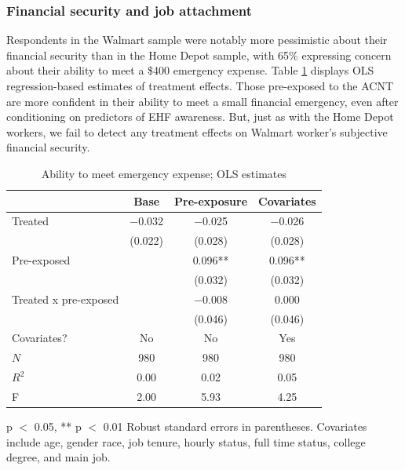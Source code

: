 \documentclass[
  11pt,
  oneside]{article}
\begin{document}
\subsubsection{Financial security and job attachment}\label{financial-security-and-job-attachment}

Respondents in the Walmart sample were notably more pessimistic about their financial security than in the Home Depot sample, with 65\% expressing concern about their ability to meet a \$400 emergency expense. Table \ref{tab:tab-finsec-wmt} displays OLS regression-based estimates of treatment effects. Those pre-exposed to the ACNT are more confident in their ability to meet a small financial emergency, even after conditioning on predictors of EHF awareness. But, just as with the Home Depot workers, we fail to detect any treatment effects on Walmart worker's subjective financial security.

\begin{table}
\centering
\caption{\label{tab:tab-finsec-wmt}Ability to meet emergency expense; OLS estimates \label{tab:tab-finsec-wmt}}
\centering
\begin{threeparttable}
\begin{tabular}[t]{lccc}
\toprule
  & Base & Pre-exposure & Covariates\\
\midrule
Treated & \num{-0.032} & \num{-0.025} & \num{-0.026}\\
 & (\num{0.022}) & (\num{0.028}) & (\num{0.028})\\
Pre-exposed &  & \num{0.096}** & \num{0.096}**\\
 &  & (\num{0.032}) & (\num{0.032})\\
Treated x pre-exposed &  & \num{-0.008} & \num{0.000}\\
 &  & (\num{0.046}) & (\num{0.046})\\
\midrule
Covariates? & No & No & Yes\\
$N$ & \num{980} & \num{980} & \num{980}\\
$R^2$ & \num{0.00} & \num{0.02} & \num{0.05}\\
F & \num{2.00} & \num{5.93} & \num{4.25}\\
\bottomrule
\end{tabular}
\begin{tablenotes}
\item * p $<$ 0.05, ** p $<$ 0.01 Robust standard errors in parentheses. Covariates include age, gender race, job tenure, hourly status, full time status, college degree, and main job.
\end{tablenotes}
\end{threeparttable}
\end{table}
\end{document}
